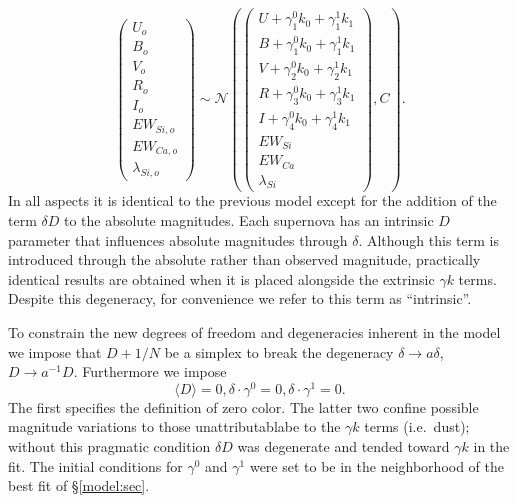 \documentclass{aastex61}   	%
\begin{document}
\begin{equation}
\begin{pmatrix}
U_o\\B_o\\ V_o\\R_o\\I_o\\EW_{Si, o}\\ EW_{Ca, o} \\ \lambda_{Si, o}
\end{pmatrix}
\sim \mathcal{N}
\left(
\begin{pmatrix}
U +\gamma^0_{1} k_0 +\gamma^1_{1} k_1 \\B +\gamma^0_{1} k_0 +\gamma^1_{1} k_1 \\
V+\gamma^0_{2} k_0+\gamma^1_{2} k_1\\R+\gamma^0_{3} k_0 + \gamma^1_{3} k_1\\I+\gamma^0_{4} k_0+\gamma^1_{4} k_1\\
EW_{Si}\\ EW_{Ca} \\ \lambda_{Si}
\end{pmatrix}
,C
\right).
\label{dust:eqn}
\end{equation}
In all aspects it is identical to the previous model except for the addition of the term $\delta D$ to the absolute magnitudes.
Each supernova has an intrinsic $D$ parameter that influences absolute magnitudes through $\delta$. 
Although
this term is introduced through the absolute rather than observed magnitude,
practically identical results are obtained when it is placed alongside the extrinsic $\gamma k$ terms.  Despite this
degeneracy, for convenience we refer to this term as ``intrinsic''.


To constrain the new degrees of freedom and degeneracies inherent in the model we impose that
$D+1/N$ be a simplex to break the 
degeneracy  $\delta \rightarrow a\delta$, $D \rightarrow a^{-1}D$.
Furthermore we impose
\begin{equation}
\langle D\rangle=0,  \delta \cdot \gamma^0=0, \delta \cdot \gamma^1=0.
\end{equation}
The first specifies the definition of zero color.   The latter two confine possible magnitude
variations to those unattributablabe to 
the $\gamma k$ terms (i.e.\ dust); without this pragmatic condition $\delta D$  
was degenerate and tended toward $\gamma k$ in the fit.  The initial conditions for
$\gamma^0$ and $\gamma^1$ were set to be in the neighborhood of the best fit of \S\ref{model:sec}.   
\end{document}
